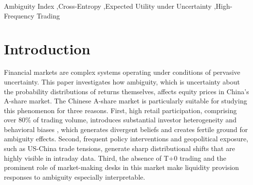 \documentclass[preprint,12pt,authoryear]{elsarticle}
\renewcommand{\textcolor}[2]{\begingroup\color{#1}#2\endgroup}
\begin{document}
\begin{frontmatter}


\begin{keyword}
Ambiguity Index \sep Cross-Entropy \sep Expected Utility under Uncertainty \sep High-Frequency Trading


\end{keyword}

\par
\end{frontmatter}



\section{Introduction}

\textcolor{red}{Financial markets are complex systems operating under conditions of pervasive uncertainty. This paper investigates how ambiguity, which is uncertainty about the probability distributions of returns themselves, affects equity prices in China's A-share market. The Chinese A-share market is particularly suitable for studying this phenomenon for three reasons. First, high retail participation, comprising over 80\% of trading volume, introduces substantial investor heterogeneity and behavioral biases \citep{guo2020retail}, which generates divergent beliefs and creates fertile ground for ambiguity effects. Second, frequent policy interventions and geopolitical exposure, such as US-China trade tensions, generate sharp distributional shifts that are highly visible in intraday data. Third, the absence of T+0 trading and the prominent role of market-making desks in this market make liquidity provision responses to ambiguity especially interpretable.}
\end{document}
